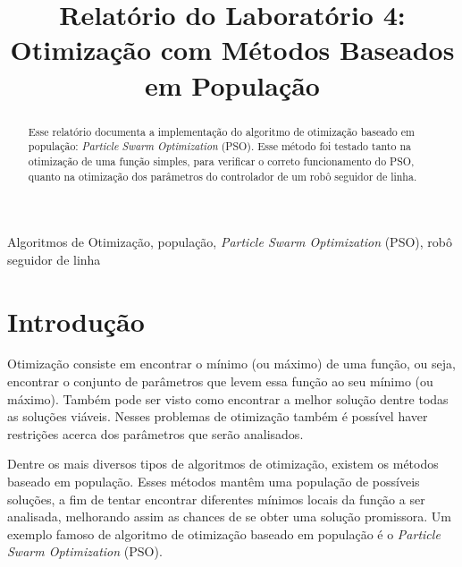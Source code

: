 \documentclass[conference]{IEEEtran}
\begin{document}
\title{Relatório do Laboratório 4: \\ Otimização com Métodos Baseados em População\\
}

\author{
}

\maketitle

\begin{abstract}
Esse relatório documenta a implementação do algoritmo de otimização baseado em população: \textit{Particle Swarm Optimization} (PSO). Esse método foi testado tanto na otimização de uma função simples, para verificar o correto funcionamento do PSO, quanto na otimização dos parâmetros do controlador de um robô seguidor de linha.
\end{abstract}

\begin{IEEEkeywords}
Algoritmos de Otimização, população, \textit{Particle Swarm Optimization} (PSO), robô seguidor de linha
\end{IEEEkeywords}

\section{Introdução}
Otimização consiste em encontrar o mínimo (ou máximo) de uma função, ou seja, encontrar o conjunto de parâmetros que levem essa função ao seu mínimo (ou máximo). Também pode ser visto como encontrar a melhor solução dentre todas as soluções viáveis. Nesses problemas de otimização também é possível haver restrições acerca dos parâmetros que serão analisados.

Dentre os mais diversos tipos de algoritmos de otimização, existem os métodos baseado em população. Esses métodos mantêm uma população de possíveis soluções, a fim de tentar encontrar diferentes mínimos locais da função a ser analisada, melhorando assim as chances de se obter uma solução promissora. Um exemplo famoso de algoritmo de otimização baseado em população é o \textit{Particle Swarm Optimization} (PSO).
\end{document}
